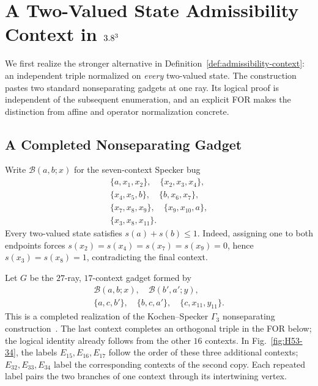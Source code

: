 \documentclass[aps,pra,reprint,superscriptaddress,longbibliography,nofootinbib,floatfix,10pt]{revtex4-2}
\theoremstyle{definition}\newtheorem{definition}[theorem]{Definition}
\theoremstyle{remark}\newtheorem{remark}[theorem]{Remark}
\begin{document}
\section{A Two-Valued State Admissibility Context in \texorpdfstring{$3.8^3$}{R3}}\label{sec:two-valued}

We first realize the stronger alternative in Definition~\ref{def:admissibility-context}: an independent triple normalized on \emph{every} two-valued state. The construction pastes two standard nonseparating gadgets at one ray. Its logical proof is independent of the subsequent enumeration, and an explicit FOR makes the distinction from affine and operator normalization concrete.

\subsection{A Completed Nonseparating Gadget}

Write $\mathcal B(a,b;x)$ for the seven-context Specker bug
\begin{equation}\label{eq:H53-bug}
\begin{gathered}
\{a,x_1,x_2\},\quad\{x_2,x_3,x_4\},\\
\{x_4,x_5,b\},\quad\{b,x_6,x_7\},\\
\{x_7,x_8,x_9\},\quad\{x_9,x_{10},a\},\\
\{x_3,x_8,x_{11}\}.
\end{gathered}
\end{equation}
Every two-valued state satisfies $s(a)+s(b)\le1$. Indeed, assigning one to both endpoints forces $s(x_2)=s(x_4)=s(x_7)=s(x_9)=0$, hence $s(x_3)=s(x_8)=1$, contradicting the final context.

Let $G$ be the $27$-ray, $17$-context gadget formed by
\begin{equation}\label{eq:H53-G}
\begin{gathered}
\mathcal B(a,b;x),\quad\mathcal B(b',a';y),\\
\{a,c,b'\},\quad\{b,c,a'\},\quad\{c,x_{11},y_{11}\}.
\end{gathered}
\end{equation}
This is a completed realization of the Kochen--Specker $\Gamma_3$ nonseparating construction~\cite{kochen1,svozil2018nonseparating}. The last context completes an orthogonal triple in the FOR below; the logical identity already follows from the other $16$ contexts. In Fig.~\ref{fig:H53-34}, the labels $E_{15},E_{16},E_{17}$ follow the order of these three additional contexts; $E_{32},E_{33},E_{34}$ label the corresponding contexts of the second copy. Each repeated label pairs the two branches of one context through its intertwining vertex.
\end{document}
